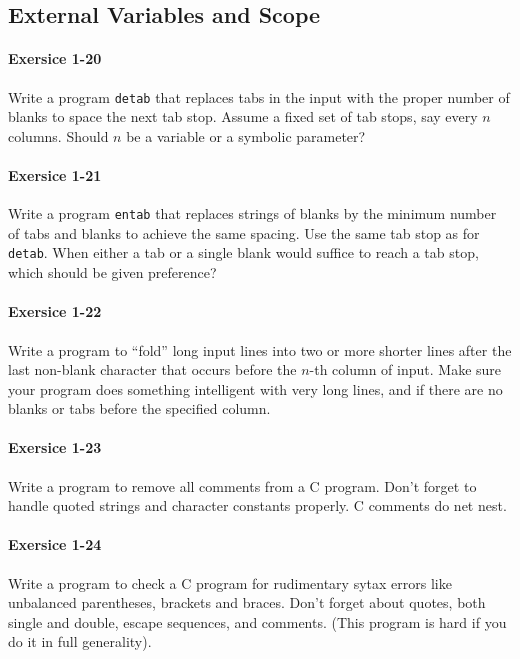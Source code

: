 			\hfill{}\cite[p.~31]{knr}

	\newpage
	\subsection{External Variables and Scope}
		\paragraph{Exersice 1-20}
			Write a program \lstinline{detab} that replaces tabs in the input
			with the proper number of blanks to space the next tab stop.
			Assume a fixed set of tab stops, say every $n$ columns. Should $n$
			be a variable or a symbolic parameter?
	
			\hfill{}\cite[p.~34]{knr}

		\paragraph{Exersice 1-21}
			Write a program \lstinline{entab} that replaces strings of blanks
			by the minimum number of tabs and blanks to achieve the same
			spacing. Use the same tab stop as for \lstinline{detab}. When
			either a tab or a single blank would suffice to reach a tab stop,
			which should be given preference?
	
			\hfill{}\cite[p.~34]{knr}

		\paragraph{Exersice 1-22}
			Write a program to ``fold'' long input lines into two or more
			shorter lines after the last non-blank character that occurs
			before the $n$-th column of input. Make sure your program does
			something intelligent with very long lines, and if there are no
			blanks or tabs before the specified column.
	
			\hfill{}\cite[p.~34]{knr}

		\paragraph{Exersice 1-23}
			Write a program to remove all comments from a C program. Don't
			forget to handle quoted strings and character constants properly.
			C comments do net nest.
	
			\hfill{}\cite[p.~34]{knr}

		\paragraph{Exersice 1-24}
			Write a program to check a C program for rudimentary sytax
			errors like unbalanced parentheses, brackets and braces. Don't
			forget about quotes, both single and double, escape sequences,
			and comments. (This program is hard if you do it in full
			generality).
	
			\hfill{}\cite[p.~34]{knr}

